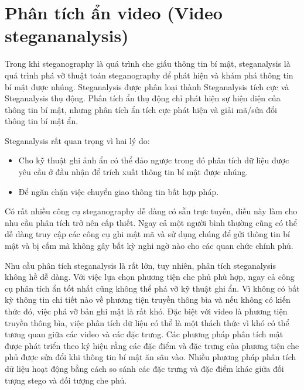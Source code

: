 \chapter{Phân tích ẩn video (Video stegananalysis)}
Trong khi steganography là quá trình che giấu thông tin bí mật, steganalysis là quá trình phá vỡ thuật toán steganography để phát hiện và khám phá thông tin bí mật được nhúng. Steganalysis được phân loại thành Steganalysis tích cực và Steganalysis thụ động. Phân tích ẩn thụ động chỉ phát hiện sự hiện diện của thông tin bí mật, nhưng phân tích ẩn tích cực phát hiện và giải mã/sửa đổi thông tin bí mật ẩn.

Steganalysis rất quan trọng vì hai lý do: 
\begin{itemize}
    \item Cho kỹ thuật ghi ảnh ẩn có thể đảo ngược trong đó phân tích dữ liệu được yêu cầu ở đầu nhận để trích xuất thông tin bí mật được nhúng.
    \item Để ngăn chặn việc chuyển giao thông tin bất hợp pháp.
\end{itemize}
 
 Có rất nhiều công cụ steganography dễ dàng có sẵn trực tuyến, điều này làm cho nhu cầu phân tích trở nên cấp thiết. Ngay cả một người bình thường cũng có thể dễ dàng truy cập các công cụ ghi mật mã và sử dụng chúng để gửi thông tin bí mật và bị cấm mà không gây bất kỳ nghi ngờ nào cho các quan chức chính phủ.

 Nhu cầu phân tích steganalysis là rất lớn, tuy nhiên, phân tích steganalysis không hề dễ dàng. Với việc lựa chọn phương tiện che phủ phù hợp, ngay cả công cụ phân tích ẩn tốt nhất cũng không thể phá vỡ kỹ thuật ghi ẩn. Vì không có bất kỳ thông tin chi tiết nào về phương tiện truyền thông bìa và nếu không có kiến thức đó, việc phá vỡ bản ghi mật là rất khó. Đặc biệt với video là phương tiện truyền thông bìa, việc phân tích dữ liệu có thể là một thách thức vì khó có thể tương quan giữa các video và các đặc trưng. Các phương pháp phân tích mật được phát triển theo ký hiệu rằng các đặc điểm và đặc trưng của phương tiện che phủ được sửa đổi khi thông tin bí mật ăn sâu vào. Nhiều phương pháp phân tích dữ liệu hoạt động bằng cách so sánh các đặc trưng và đặc điểm khác giữa đối tượng stego và đối tượng che phủ.

